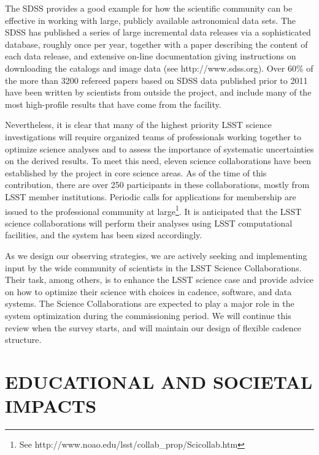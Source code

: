 \documentclass{emulateapj}
\begin{document}
The SDSS provides a good example for how the scientific 
community can be effective in working with large, publicly available
astronomical data sets. The SDSS has published a series of large incremental
data releases via a sophisticated database, roughly once per year, together with 
a paper describing the content of each data release, and extensive on-line 
documentation giving instructions on downloading the catalogs and image data
(see http://www.sdss.org). Over 60\% of the more than 3200 refereed papers based 
on SDSS data published prior to 2011 have been written by scientists from outside 
the project, and  include many of the most high-profile results that have come 
from the facility. 

Nevertheless, it is clear that many of the highest priority LSST science
investigations will require organized teams of professionals working together
to optimize science analyses and to assess the importance of systematic 
uncertainties on the derived results. To meet this need, eleven science
collaborations have been established by the project in core science
areas. As of the time of this contribution, there 
are over 250 participants in these collaborations, mostly from LSST 
member institutions. Periodic
calls for applications for membership are issued to the professional 
community at large\footnote{See http://www.noao.edu/lsst/collab\_prop/Scicollab.htm}.
It is anticipated that the LSST science collaborations 
will perform their analyses using LSST computational facilities, and the 
system has been sized accordingly. 

As we design our observing strategies, we are actively seeking and implementing
input by the wide community of scientists in the LSST Science Collaborations. 
Their task, among others, is to enhance the LSST science case and provide
advice on how to optimize their science with choices in cadence, software, 
and data systems. The Science Collaborations are expected to play a major role 
in the system optimization during the commissioning period. We will continue 
this review when the survey starts, and will maintain our design of flexible 
cadence structure.



\section{   EDUCATIONAL AND SOCIETAL IMPACTS    }
\label{Sec:impact}
\end{document}
